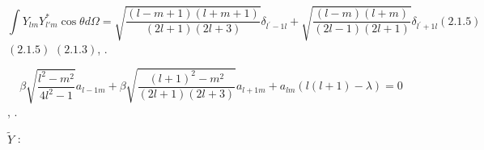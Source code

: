 \documentclass[a4paper]{article}
\begin{document}
\begin{equation*}
\int Y_{\mathit{lm}}Y_{l'm}^{\ast }\cos \theta \mathit{d\Omega
}=\sqrt{\frac{(l-m+1)(l+m+1)}{\left(2l+1\right)(2l+3)}}\delta
_{l^'-1l}+\sqrt{\frac{(l-m)(l+m)}{\left(2l-1\right)(2l+1)}}\delta _{l^'+1l}(2.1.5)
\end{equation*}
{\CYRP}{\cyrr}{\cyri} {\cyrp}{\cyro}{\cyrd}{\cyrs}{\cyrt}{\cyra}{\cyrn}{\cyro}{\cyrv}{\cyrk}{\cyre}  $(2.1.5)$ {\cyrv} 
$(2.1.3)$, {\cyrp}{\cyro}{\cyrl}{\cyru}{\cyrch}{\cyra}{\cyre}{\cyrm}.

\begin{equation*}
\beta \sqrt{\frac{l^2-m^2}{4l^2-1}}a_{l-1m}+\beta
\sqrt{\frac{\left(l+1\right)^2-m^2}{\left(2l+1\right)(2l+3)}}a_{l+1m}+a_{\mathit{lm}}\left(l\left(l+1\right)-\lambda
\right)=0
\end{equation*}
{\CYRM}{\cyrery} {\cyrp}{\cyro}{\cyrl}{\cyru}{\cyrch}{\cyri}{\cyrl}{\cyri}
{\cyrs}{\cyri}{\cyrs}{\cyrt}{\cyre}{\cyrm}{\cyru} {\cyrl}{\cyri}{\cyrn}{\cyre}{\cyrishrt}{\cyrn}{\cyrery}{\cyrh}
{\cyra}{\cyrl}{\cyrg}{\cyre}{\cyrb}{\cyrr}{\cyra}{\cyri}{\cyrch}{\cyre}{\cyrs}{\cyrk}{\cyri}{\cyrh}
{\cyru}{\cyrr}{\cyra}{\cyrv}{\cyrn}{\cyre}{\cyrn}{\cyri}{\cyrishrt}, {\cyrk}{\cyro}{\cyrt}{\cyro}{\cyrr}{\cyru}{\cyryu}
{\cyrm}{\cyro}{\cyrzh}{\cyrn}{\cyro} {\cyrr}{\cyre}{\cyrsh}{\cyri}{\cyrt}{\cyrsftsn} {\cyrv}
{\cyrl}{\cyryu}{\cyrb}{\cyro}{\cyrm}
{\cyrm}{\cyra}{\cyrt}{\cyre}{\cyrm}{\cyra}{\cyrt}{\cyri}{\cyrch}{\cyre}{\cyrs}{\cyrk}{\cyro}{\cyrm}
{\cyrp}{\cyra}{\cyrk}{\cyre}{\cyrt}{\cyre}.

{\CYRP}{\cyrr}{\cyri}{\cyrv}{\cyre}{\cyrd}{\cyre}{\cyrm} {\cyrg}{\cyrr}{\cyra}{\cyrf}{\cyri}{\cyrk}{\cyri}
{\cyrf}{\cyru}{\cyrn}{\cyrk}{\cyrc}{\cyri}{\cyrishrt}  $\widetilde Y$ {\cyrp}{\cyrr}{\cyri}
{\cyrr}{\cyra}{\cyrz}{\cyrl}{\cyri}{\cyrch}{\cyrn}{\cyrery}{\cyrh}
{\cyrz}{\cyrn}{\cyra}{\cyrch}{\cyre}{\cyrn}{\cyri}{\cyrya}{\cyrh}
{\cyrd}{\cyri}{\cyrp}{\cyro}{\cyrl}{\cyrsftsn}{\cyrn}{\cyro}{\cyrg}{\cyro}
{\cyrm}{\cyro}{\cyrm}{\cyre}{\cyrn}{\cyrt}{\cyra}:
\end{document}
